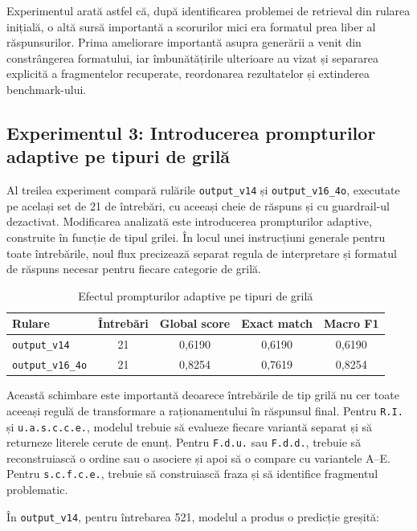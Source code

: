 \documentclass[12pt, a4paper, oneside, romanian]{teza-upb}
\begin{document}
Experimentul arată astfel că, după identificarea problemei de retrieval din rularea inițială, o altă sursă importantă a scorurilor mici era formatul prea liber al răspunsurilor. Prima ameliorare importantă asupra generării a venit din constrângerea formatului, iar îmbunătățirile ulterioare au vizat și separarea explicită a fragmentelor recuperate, reordonarea rezultatelor și extinderea benchmark-ului.

\subsection{Experimentul 3: Introducerea prompturilor adaptive pe tipuri de grilă}

Al treilea experiment compară rulările \texttt{output\_v14} și \texttt{output\_v16\_4o}, executate pe același set de 21 de întrebări, cu aceeași cheie de răspuns și cu guardrail-ul dezactivat. Modificarea analizată este introducerea prompturilor adaptive, construite în funcție de tipul grilei. În locul unei instrucțiuni generale pentru toate întrebările, noul flux precizează separat regula de interpretare și formatul de răspuns necesar pentru fiecare categorie de grilă.

\begin{table}[H]
\centering
\caption{Efectul prompturilor adaptive pe tipuri de grilă}
\label{tab:experiment_model_v14_v16}
\small
\begin{tabular}{lcccc}
\toprule
\textbf{Rulare} & \textbf{Întrebări} & \textbf{Global score} & \textbf{Exact match} & \textbf{Macro F1} \\
\midrule
\texttt{output\_v14} & 21 & 0,6190 & 0,6190 & 0,6190 \\
\texttt{output\_v16\_4o} & 21 & 0,8254 & 0,7619 & 0,8254 \\
\bottomrule
\end{tabular}
\end{table}

Această schimbare este importantă deoarece întrebările de tip grilă nu cer toate aceeași regulă de transformare a raționamentului în răspunsul final. Pentru \texttt{R.I.} și \texttt{u.a.s.c.c.e.}, modelul trebuie să evalueze fiecare variantă separat și să returneze literele cerute de enunț. Pentru \texttt{F.d.u.} sau \texttt{F.d.d.}, trebuie să reconstruiască o ordine sau o asociere și apoi să o compare cu variantele A--E. Pentru \texttt{s.c.f.c.e.}, trebuie să construiască fraza și să identifice fragmentul problematic.

În \texttt{output\_v14}, pentru întrebarea 521, modelul a produs o predicție greșită:
\end{document}
